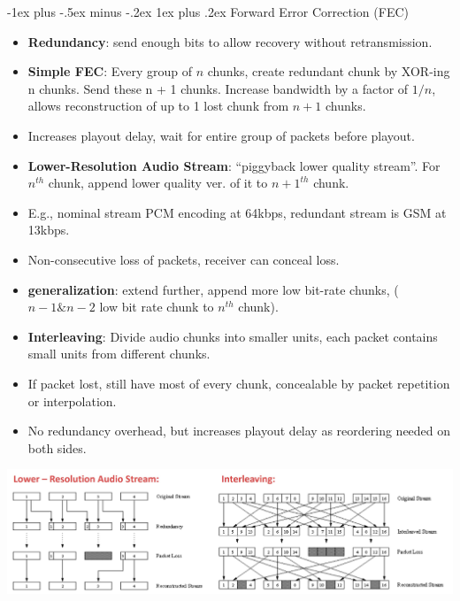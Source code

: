 \documentclass[12pt, landscape]{article}
\makeatletter
\renewcommand{\subsubsection}{\@startsection{subsubsection}{3}{0.1mm}%
                                {-1ex plus -.5ex minus -.2ex}%
                                {1ex plus .2ex}%
                                {\normalfont\small\bfseries}}
\makeatother
\begin{document}
\begin{multicols*}{3}
\subsubsection{Forward Error Correction (FEC)}
\begin{itemize}
\item \textbf{Redundancy}: send enough bits to allow recovery without retransmission.
\item \textbf{Simple FEC}: Every group of $n$ chunks, create redundant chunk by XOR-ing n chunks. Send these n + 1 chunks. Increase bandwidth by a factor of $1/n$, allows reconstruction of up to 1 lost chunk from $n+1$ chunks. \
\item Increases playout delay, wait for entire group of packets before playout.
\item \textbf{Lower-Resolution Audio Stream}: ``piggyback lower quality stream''. For $n^{th}$ chunk, append lower quality ver. of it to $n+1^{th}$ chunk. 
\item E.g., nominal stream PCM encoding at 64kbps, redundant stream is GSM at 13kbps. 
\item Non-consecutive loss of packets, receiver can conceal loss.
\item \textbf{generalization}: extend further, append more low bit-rate chunks, ($n-1 \& n-2$ low bit rate chunk to $n^{th}$ chunk).
\item \textbf{Interleaving}: Divide audio chunks into smaller units, each packet contains small units from different chunks.
\item If packet lost, still have most of every chunk, concealable by packet repetition or interpolation. 
\item No redundancy overhead, but increases playout delay as reordering needed on both sides.
\end{itemize}
\centerline{\includegraphics[width=1\linewidth]{FEC}}

\vfill \null
\columnbreak


\end{multicols*}
\end{document}

